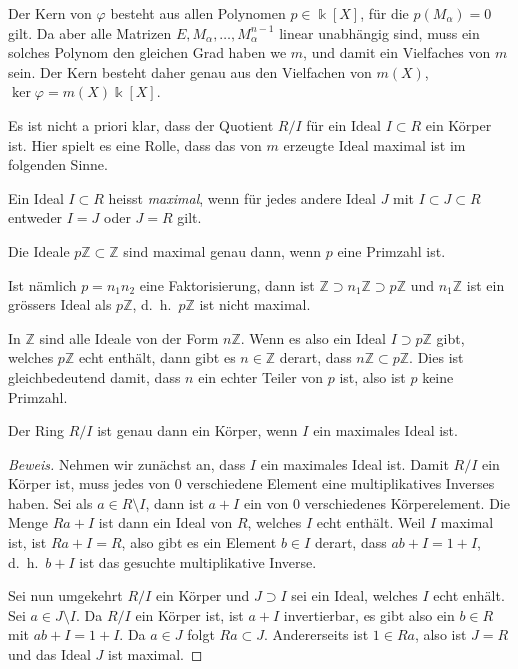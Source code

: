 Der Kern von $\varphi$ besteht aus allen Polynomen $p\in\Bbbk[X]$,
für die $p(M_\alpha)=0$ gilt.
Da aber alle Matrizen $E,M_\alpha,\dots,M_\alpha^{n-1}$ linear
unabhängig sind, muss ein solches Polynom den gleichen Grad haben
we $m$, und damit ein Vielfaches von $m$ sein.
Der Kern besteht daher genau aus den Vielfachen von $m(X)$,
$\ker\varphi = m(X)\Bbbk[X]$.

Es ist nicht a priori klar, dass der Quotient $R/I$ für ein
Ideal $I\subset R$ ein Körper ist.
Hier spielt es eine Rolle, dass das von $m$ erzeugte Ideal
maximal ist im folgenden Sinne.

\begin{definition}
Ein Ideal $I\subset R$ heisst {\em maximal}, wenn für jedes andere Ideal
$J$ mit $I\subset J\subset R$ entweder $I=J$ oder $J=R$ gilt.
\end{definition}

\begin{beispiel}
Die Ideale $p\mathbb{Z}\subset \mathbb{Z}$ sind maximal genau dann, wenn
$p$ eine Primzahl ist.

Ist nämlich $p=n_1n_2$ eine Faktorisierung, dann ist
$\mathbb{Z}\supset n_1\mathbb{Z} \supset p\mathbb{Z}$ 
und $n_1\mathbb{Z}$ ist ein grössers Ideal als $p\mathbb{Z}$,
d.~h.~$p\mathbb{Z}$ ist nicht maximal.

In $\mathbb{Z}$ sind alle Ideale von der Form $n\mathbb{Z}$.
Wenn es also ein Ideal $I\supset p\mathbb{Z}$ gibt, welches
$p\mathbb{Z}$ echt enthält, dann gibt es $n\in\mathbb{Z}$ derart,
dass $n\mathbb{Z} \subset p\mathbb{Z}$.
Dies ist gleichbedeutend damit, dass $n$ ein echter Teiler von $p$
ist, also ist $p$ keine Primzahl.
\end{beispiel}

\begin{satz}
Der Ring $R/I$ ist genau dann ein Körper, wenn $I$ ein maximales Ideal ist.
\end{satz}

\begin{proof}[Beweis]
Nehmen wir zunächst an, dass $I$ ein maximales Ideal ist.
Damit $R/I$ ein Körper ist, muss jedes von $0$ verschiedene Element 
eine multiplikatives Inverses haben.
Sei als $a\in R\setminus I$, dann ist $a+I$ ein von $0$ verschiedenes
Körperelement.
Die Menge $Ra+I$ ist dann ein Ideal von $R$, welches $I$ echt enthält.
Weil $I$ maximal ist, ist $Ra+I=R$, also gibt es ein Element $b\in I$
derart, dass $ab+I=1+I$, d.~h.~$b+I$ ist das gesuchte multiplikative 
Inverse.

Sei nun umgekehrt $R/I$ ein Körper und $J\supset I$ sei ein Ideal,
welches $I$ echt enhält.
Sei $a\in J\setminus I$.
Da $R/I$ ein Körper ist, ist $a+I$ invertierbar, es gibt also ein
$b\in R$ mit $ab+I=1+I$.
Da $a\in J$ folgt $Ra\subset J$.
Andererseits ist $1\in Ra$, also ist $J=R$ und das Ideal $J$ ist maximal.
\end{proof}


